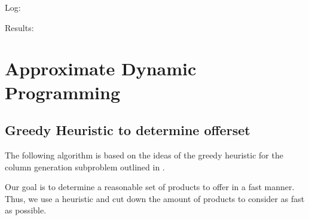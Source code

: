 Log:



Results:



\section{Approximate Dynamic Programming}

\subsection{Greedy Heuristic to determine offerset}

The following algorithm is based on the ideas of the greedy heuristic for the column generation subproblem outlined in \cite{Bront.2009}.

Our goal is to determine a reasonable set of products to offer in a fast manner. Thus, we use a heuristic and cut down the amount of products to consider as fast as possible.

